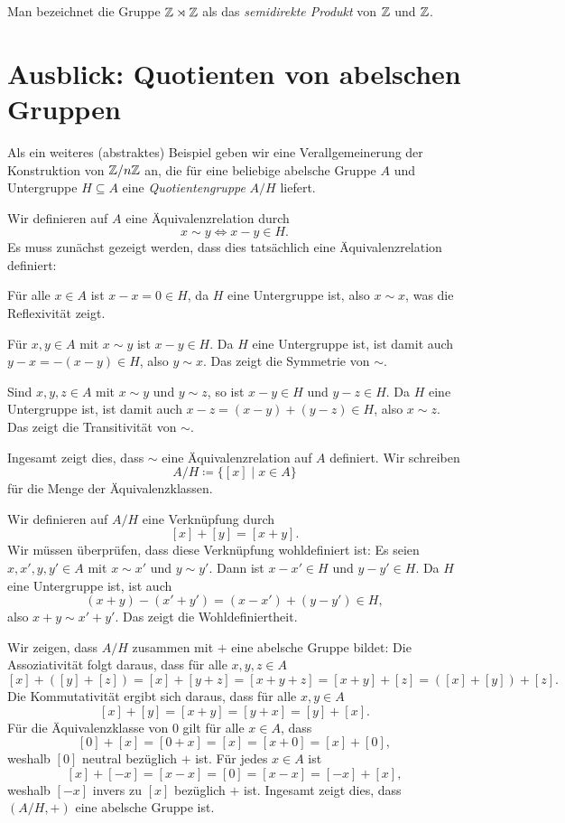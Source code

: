 Man bezeichnet die Gruppe $\mathbb{Z} \rtimes \mathbb{Z}$ als das \emph{semidirekte Produkt} von $\mathbb{Z}$ und $\mathbb{Z}$.










\section{Ausblick: Quotienten von abelschen Gruppen}
Als ein weiteres (abstraktes) Beispiel geben wir eine Verallgemeinerung der Konstruktion von $\mathbb{Z}/n\mathbb{Z}$ an, die für eine beliebige abelsche Gruppe $A$ und Untergruppe $H \subseteq A$ eine \emph{Quotientengruppe} $A/H$ liefert.

Wir definieren auf $A$ eine Äquivalenzrelation durch
\[
 x \sim y \iff x-y \in H.
\]
Es muss zunächst gezeigt werden, dass dies tatsächlich eine Äquivalenzrelation definiert:

Für alle $x \in A$ ist $x-x = 0 \in H$, da $H$ eine Untergruppe ist, also $x \sim x$, was die Reflexivität zeigt.

Für $x,y \in A$ mit $x \sim y$ ist $x-y \in H$. Da $H$ eine Untergruppe ist, ist damit auch $y-x = -(x-y) \in H$, also $y \sim x$. Das zeigt die Symmetrie von $\sim$.

Sind $x,y,z \in A$ mit $x \sim y$ und $y \sim z$, so ist $x-y \in H$ und $y-z \in H$. Da $H$ eine Untergruppe ist, ist damit auch $x-z = (x-y)+(y-z) \in H$, also $x \sim z$. Das zeigt die Transitivität von $\sim$.

Ingesamt zeigt dies, dass $\sim$ eine Äquivalenzrelation auf $A$ definiert. Wir schreiben
\[
 A/H
 \coloneqq \{[x] \mid x \in A\}
\]
für die Menge der Äquivalenzklassen.

Wir definieren auf $A/H$ eine Verknüpfung durch
\[
 [x]+[y] = [x+y].
\]
Wir müssen überprüfen, dass diese Verknüpfung wohldefiniert ist: Es seien $x, x', y, y' \in A$ mit $x \sim x'$ und $y \sim y'$. Dann ist $x-x' \in H$ und $y-y' \in H$. Da $H$ eine Untergruppe ist, ist auch
\[
 (x+y)-(x'+y') = (x-x') + (y-y') \in H,
\]
also $x+y \sim x'+y'$. Das zeigt die Wohldefiniertheit.

Wir zeigen, dass $A/H$ zusammen mit $+$ eine abelsche Gruppe bildet: Die Assoziativität folgt daraus, dass für alle $x,y,z \in A$
\[
 [x] + ([y] + [z])
 = [x] + [y+z]
 = [x+y+z]
 = [x+y] + [z]
 = ([x] + [y]) + [z].
\]
Die Kommutativität ergibt sich daraus, dass für alle $x,y \in A$
\[
 [x] + [y] = [x+y] = [y+x] = [y] + [x].
\]
Für die Äquivalenzklasse von $0$ gilt für alle $x \in A$, dass
\[
 [0] + [x] = [0+x] = [x] = [x+0] = [x] + [0], 
\]
weshalb $[0]$ neutral bezüglich $+$ ist. Für jedes $x \in A$ ist
\[
 [x] + [-x] = [x-x] = [0] = [x-x] = [-x] + [x],
\]
weshalb $[-x]$ invers zu $[x]$ bezüglich $+$ ist. Ingesamt zeigt dies, dass $(A/H, +)$ eine abelsche Gruppe ist.


